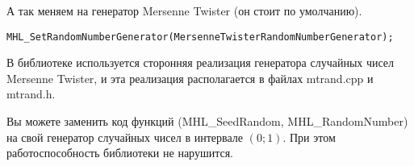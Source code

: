 А так меняем на генератор Mersenne Twister (он стоит по умолчанию).
\begin{lstlisting}[label=SetRandomNumberGenerator,caption=Меняем на генератор случайных чисел Mersenne Twister]
MHL_SetRandomNumberGenerator(MersenneTwisterRandomNumberGenerator);
\end{lstlisting}

В библиотеке используется сторонняя реализация генератора случайных чисел Mersenne Twister, и эта реализация располагается в файлах mtrand.cpp и mtrand.h.

Вы можете заменить код функций (MHL\_SeedRandom, MHL\_RandomNumber) на свой генератор случайных чисел в интервале $\left( 0; 1\right)$. При этом работоспособность библиотеки не нарушится.